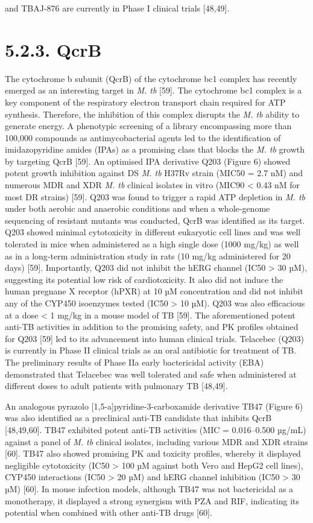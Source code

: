 \documentclass{article}
\begin{document}
and TBAJ-876 are currently in Phase I clinical trials [48,49].

\section{5.2.3. QcrB}

The cytochrome b subunit (QcrB) of the cytochrome bc1 complex has recently emerged as an interesting target in \textit{M. tb} [59]. The cytochrome bc1 complex is a key component of the respiratory electron transport chain required for ATP synthesis. Therefore, the inhibition of this complex disrupts the \textit{M. tb} ability to generate energy. A phenotypic screening of a library encompassing more than 100,000 compounds as antimycobacterial agents led to the identification of imidazopyridine amides (IPAs) as a promising class that blocks the \textit{M. tb} growth by targeting QcrB [59]. An optimised IPA derivative Q203 (Figure 6) showed potent growth inhibition against DS \textit{M. tb} H37Rv strain (MIC50 = 2.7 nM) and numerous MDR and XDR \textit{M. tb} clinical isolates in vitro (MIC90 < 0.43 nM for most DR strains) [59]. Q203 was found to trigger a rapid ATP depletion in \textit{M. tb} under both aerobic and anaerobic conditions and when a whole-genome sequencing of resistant mutants was conducted, QcrB was identified as its target. Q203 showed minimal cytotoxicity in different eukaryotic cell lines and was well tolerated in mice when administered as a high single dose (1000 mg/kg) as well as in a long-term administration study in rats (10 mg/kg administered for 20 days) [59]. Importantly, Q203 did not inhibit the hERG channel (IC50 > 30 µM), suggesting its potential low risk of cardiotoxicity. It also did not induce the human pregnane X receptor (hPXR) at 10 µM concentration and did not inhibit any of the CYP450 isoenzymes tested (IC50 > 10 µM). Q203 was also efficacious at a dose < 1 mg/kg in a mouse model of TB [59]. The aforementioned potent anti-TB activities in addition to the promising safety, and PK profiles obtained for Q203 [59] led to its advancement into human clinical trials. Telacebec (Q203) is currently in Phase II clinical trials as an oral antibiotic for treatment of TB. The preliminary results of Phase IIa early bactericidal activity (EBA) demonstrated that Telacebec was well tolerated and safe when administered at different doses to adult patients with pulmonary TB [48,49].

An analogous pyrazolo [1,5-a]pyridine-3-carboxamide derivative TB47 (Figure 6) was also identified as a preclinical anti-TB candidate that inhibits QcrB [48,49,60]. TB47 exhibited potent anti-TB activities (MIC = 0.016–0.500 µg/mL) against a panel of \textit{M. tb} clinical isolates, including various MDR and XDR strains [60]. TB47 also showed promising PK and toxicity profiles, whereby it displayed negligible cytotoxicity (IC50 > 100 µM against both Vero and HepG2 cell lines), CYP450 interactions (IC50 > 20 µM) and hERG channel inhibition (IC50 > 30 µM) [60]. In mouse infection models, although TB47 was not bactericidal as a monotherapy, it displayed a strong synergism with PZA and RIF, indicating its potential when combined with other anti-TB drugs [60].
\end{document}
